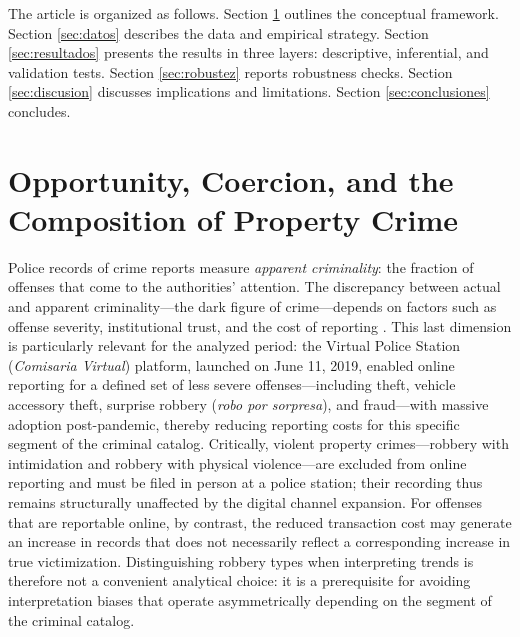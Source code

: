 \documentclass[pdflatex,sn-basic]{sn-jnl}
\begin{document}
The article is organized as follows. Section \ref{sec:marco} outlines the conceptual framework. Section \ref{sec:datos} describes the data and empirical strategy. Section \ref{sec:resultados} presents the results in three layers: descriptive, inferential, and validation tests. Section \ref{sec:robustez} reports robustness checks. Section \ref{sec:discusion} discusses implications and limitations. Section \ref{sec:conclusiones} concludes.


\section{Opportunity, Coercion, and the Composition of Property Crime}
\label{sec:marco}

Police records of crime reports measure \emph{apparent criminality}: the fraction of offenses that come to the authorities' attention. The discrepancy between actual and apparent criminality---the dark figure of crime---depends on factors such as offense severity, institutional trust, and the cost of reporting \citep{gamarra2024a}. This last dimension is particularly relevant for the analyzed period: the Virtual Police Station (\textit{Comisaria Virtual}) platform, launched on June 11, 2019, enabled online reporting for a defined set of less severe offenses---including theft, vehicle accessory theft, surprise robbery (\textit{robo por sorpresa}), and fraud---with massive adoption post-pandemic, thereby reducing reporting costs for this specific segment of the criminal catalog. Critically, violent property crimes---robbery with intimidation and robbery with physical violence---are excluded from online reporting and must be filed in person at a police station; their recording thus remains structurally unaffected by the digital channel expansion. For offenses that are reportable online, by contrast, the reduced transaction cost may generate an increase in records that does not necessarily reflect a corresponding increase in true victimization. Distinguishing robbery types when interpreting trends is therefore not a convenient analytical choice: it is a prerequisite for avoiding interpretation biases that operate asymmetrically depending on the segment of the criminal catalog.
\end{document}
